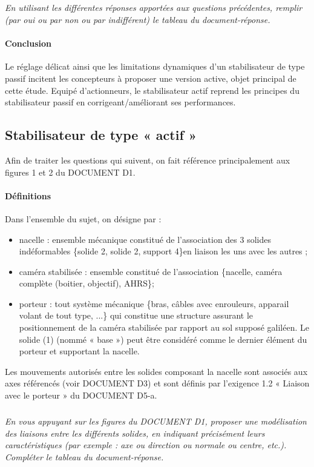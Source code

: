 \documentclass[10pt,fleqn]{article} %
\begin{document}
\subparagraph{\label{q7}}\textit{En utilisant les différentes réponses apportées aux questions précédentes, remplir (par oui ou par non ou par indifférent) le tableau du document-réponse.}

\paragraph*{Conclusion}
Le réglage délicat ainsi que les limitations dynamiques d'un stabilisateur de type passif incitent les concepteurs à proposer une version active, objet principal de cette étude. Equipé d'actionneurs, le stabilisateur actif reprend les principes du stabilisateur passif en corrigeant/améliorant ses performances.

\subsection{Stabilisateur de type « actif »}

Afin de traiter les questions qui suivent, on fait référence principalement aux figures 1 et 2 du DOCUMENT D1.
\paragraph*{Définitions}
Dans l'ensemble du sujet, on désigne par :
\begin{itemize}
\item nacelle : ensemble mécanique constitué de l'association des 3 solides indéformables \{solide 2, solide 2, support 4\}en liaison les uns avec les autres ;
\item caméra stabilisée : ensemble constitué de l'association  \{nacelle, caméra complète (boitier, objectif), AHRS\};
\item porteur : tout système mécanique \{bras, câbles avec enrouleurs, apparail volant de tout type, ...\} qui constitue une structure assurant le positionnement de la caméra stabilisée par rapport au sol supposé galiléen. Le solide (1) (nommé « base ») peut être considéré comme le dernier élément du porteur et supportant la nacelle.
\end{itemize}

Les mouvements autorisés entre les solides composant la nacelle sont associés aux axes référencés (voir DOCUMENT D3) et sont définis par l’exigence 1.2 « Liaison avec le porteur » du DOCUMENT D5-a.

\subparagraph{\label{q8}}\textit{En vous appuyant sur les figures du DOCUMENT D1, proposer une modélisation des liaisons entre les différents solides, en indiquant précisément leurs caractéristiques (par exemple : axe ou direction ou normale ou centre, etc.). Compléter le tableau du document-réponse.}
\end{document}
